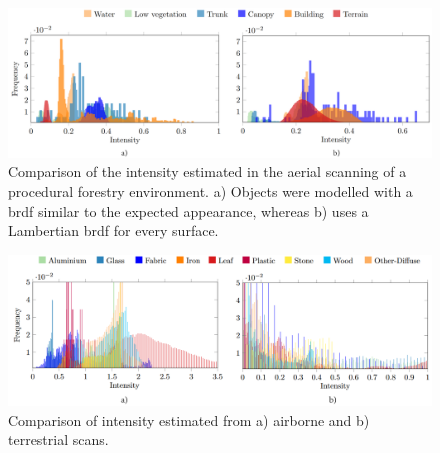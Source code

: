 \begin{figure}[ht]
	\centering
	\includegraphics[width=\linewidth]{figs/lidar_intensity/analytical_intensity_lambertian.png}
	\caption{Comparison of the intensity estimated in the aerial scanning of a procedural forestry environment. a) Objects were modelled with a \acrshort{brdf} similar to the expected appearance, whereas b) uses a Lambertian \acrshort{brdf} for every surface.  }
	\label{fig:database_intensity_lambertian_results}
\end{figure}

\begin{figure}[ht]
	\centering
	\includegraphics[width=\linewidth]{figs/lidar_intensity/analytical_brdf_intensity_chart.png}
	\caption{Comparison of intensity estimated from a) airborne and b) terrestrial scans. }
	\label{fig:analytical_brdf_results}
\end{figure}


